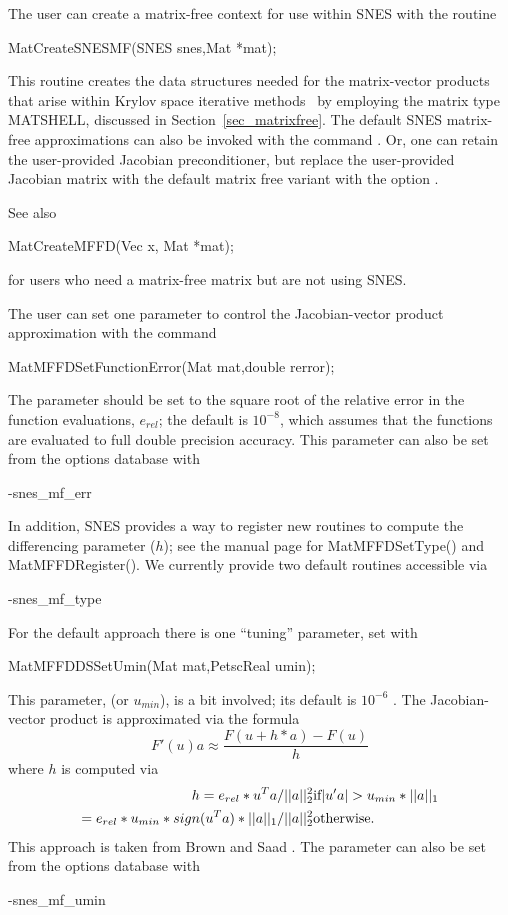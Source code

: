 The user can create a matrix-free context for use within SNES with
the routine
\begin{tabbing}
  MatCreateSNESMF(SNES snes,Mat *mat);
\end{tabbing}
This routine creates the data structures needed for the matrix-vector
products that arise within Krylov space iterative methods~\cite{brownsaad:90}
by employing the matrix type MATSHELL,
discussed in Section~\ref{sec_matrixfree}.  The default SNES matrix-free
approximations can also be invoked with the command . 
Or, one can retain the user-provided Jacobian preconditioner, but replace the
user-provided Jacobian matrix with the default matrix free variant with the
option . 

See also
\begin{tabbing}
  MatCreateMFFD(Vec x, Mat *mat);
\end{tabbing}
for users who need a matrix-free matrix but are not using SNES.

The user can set one parameter to control the Jacobian-vector
product approximation with the command
\begin{tabbing}
  MatMFFDSetFunctionError(Mat mat,double rerror);
\end{tabbing}
The parameter  should be set to the square root of the
relative error in the function evaluations, $e_{rel}$; the default is $ 10^{-8} $,
which assumes that the functions are evaluated to full double precision accuracy.
This parameter can also be set from the options database with
\begin{tabbing}
   -snes\_mf\_err 
\end{tabbing}

In addition, SNES provides a way to register new routines to compute the differencing parameter ($h$);
see the manual page for MatMFFDSetType() and MatMFFDRegister(). We currently provide two default routines accessible via
\begin{tabbing}
  -snes\_mf\_type 
\end{tabbing}
For the default approach there is one ``tuning'' parameter, set with
\begin{tabbing}
  MatMFFDDSSetUmin(Mat mat,PetscReal umin);
\end{tabbing}
This parameter,  (or $u_{min}$), is a bit involved; its default is
$ 10^{-6} $ . The Jacobian-vector product is approximated via the formula
\[
    F'(u) a \approx \frac{F(u + h*a) - F(u)}{h}
\]
where $ h $ is computed via
\begin{eqnarray*}
        h = e_{rel}*u^{T}a/||a||^2_2                       &    \hbox{if}  |u'a| > u_{min}*||a||_{1} \\
          = e_{rel}*u_{min}*sign(u^{T}a)*||a||_{1}/||a||^2_2  &    \hbox{otherwise}.
\end{eqnarray*}
This approach is taken from Brown and Saad \cite{brownsaad:90}.
The parameter can also be set from the options database with
\begin{tabbing}
   -snes\_mf\_umin 
\end{tabbing}

